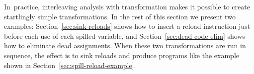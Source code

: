 \documentclass[blockstyle,preprint,natbib,nocopyrightspace]{sigplanconf}
\newcommand{\authornote}[1]{{\em #1}}
\def\authornote#1{\unskip\relax}
\newcommand{\simon}[1]{\authornote{SLPJ: #1}}
\newcommand\secref[1]{Section~\ref{sec:#1}}
\begin{document}


In~practice, interleaving analysis with transformation makes it
possible to create startlingly simple transformations.
In the rest of this section we present two examples:
\secref{sink-reloads} shows how to insert a reload instruction just
before each use of each spilled variable, and
\secref{dead-code-elim} shows how to eliminate dead assignments.
When these two transformations are run in sequence, the effect is to
sink reloads and produce programs like the example shown in
\secref{spill-reload-example}. 
\end{document}
